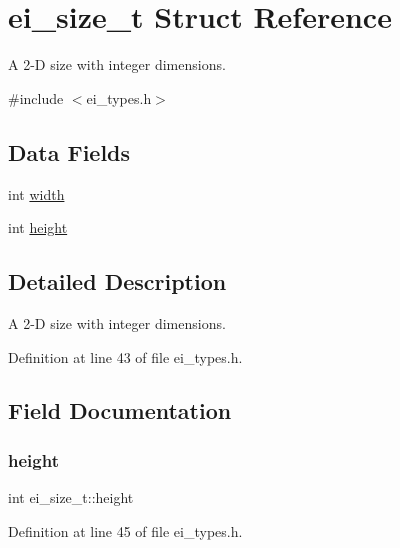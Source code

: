 \hypertarget{structei__size__t}{}\section{ei\+\_\+size\+\_\+t Struct Reference}
\label{structei__size__t}


A 2-\/D size with integer dimensions.  




{\ttfamily \#include $<$ei\+\_\+types.\+h$>$}

\subsection*{Data Fields}
\begin{DoxyCompactItemize}
\item 
int \hyperlink{structei__size__t_a981037618942814a4318a4c27cdaecc1}{width}
\item 
int \hyperlink{structei__size__t_a2f152e26c90d01cac2b337ebc118a5f1}{height}
\end{DoxyCompactItemize}


\subsection{Detailed Description}
A 2-\/D size with integer dimensions. 

Definition at line 43 of file ei\+\_\+types.\+h.



\subsection{Field Documentation}
\mbox{\label{structei__size__t_a2f152e26c90d01cac2b337ebc118a5f1}} 
\subsubsection{\texorpdfstring{height}{height}}
{\footnotesize\ttfamily int ei\+\_\+size\+\_\+t\+::height}



Definition at line 45 of file ei\+\_\+types.\+h.

\mbox{\label{structei__size__t_a981037618942814a4318a4c27cdaecc1}} 
